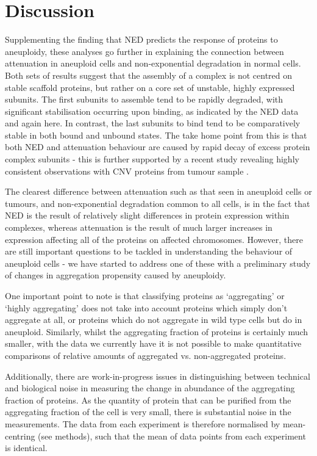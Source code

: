 \documentclass[a4paper,11pt,twoside,openright]{scrbook}
\begin{document}
\section{Discussion}
Supplementing the finding that NED predicts the response of proteins to
aneuploidy, these analyses go further in explaining the connection between
attenuation in aneuploid cells and non-exponential degradation in normal cells.
Both sets of results suggest that the assembly of a complex is not centred on
stable scaffold proteins, but rather on a core set of unstable, highly expressed
subunits. The first subunits to assemble tend to be rapidly degraded, with
significant stabilisation occurring upon binding, as indicated by the NED data
and again here. In contrast, the last subunits to bind tend to be comparatively
stable in both bound and unbound states. The take home point from this is that
both NED and attenuation behaviour are caused by rapid decay of excess protein
complex subunits - this is further supported by a recent study revealing highly
consistent observations with CNV proteins from tumour sample
\cite{Goncalves2017}.

The clearest difference between attenuation such as that seen in aneuploid cells
or tumours, and non-exponential degradation common to all cells, is in the fact
that NED is the result of relatively slight differences in protein expression
within complexes, whereas attenuation is the result of much larger increases in
expression affecting all of the proteins on affected chromosomes. However, there
are still important questions to be tackled in understanding the behaviour of
aneuploid cells - we have started to address one of these with a preliminary
study of changes in aggregation propensity caused by aneuploidy.

One important point to note is that classifying proteins as `aggregating' or
`highly aggregating' does not take into account proteins which simply don't
aggregate at all, or proteins which do not aggregate in wild type cells but do
in aneuploid. Similarly, whilst the aggregating fraction of proteins is
certainly much smaller, with the data we currently have it is not possible to
make quantitative comparisons of relative amounts of aggregated vs.
non-aggregated proteins.

Additionally, there are work-in-progress issues in distinguishing between
technical and biological noise in measuring the change in abundance of the
aggregating fraction of proteins. As the quantity of protein that can be
purified from the aggregating fraction of the cell is very small, there is
substantial noise in the measurements. The data from each experiment is
therefore normalised by mean-centring (see methods), such that the mean of data
points from each experiment is identical.
\end{document}
